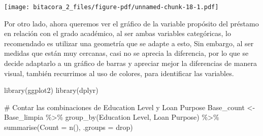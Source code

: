 \documentclass[
  letterpaper,
  DIV=11,
  numbers=noendperiod]{scrreprt}
\newenvironment{Shaded}{\begin{snugshade}}{\end{snugshade}}
\newcommand{\AttributeTok}[1]{\textcolor[rgb]{0.40,0.45,0.13}{#1}}
\newcommand{\CommentTok}[1]{\textcolor[rgb]{0.37,0.37,0.37}{#1}}
\newcommand{\FunctionTok}[1]{\textcolor[rgb]{0.28,0.35,0.67}{#1}}
\newcommand{\NormalTok}[1]{\textcolor[rgb]{0.00,0.23,0.31}{#1}}
\newcommand{\OtherTok}[1]{\textcolor[rgb]{0.00,0.23,0.31}{#1}}
\newcommand{\SpecialCharTok}[1]{\textcolor[rgb]{0.37,0.37,0.37}{#1}}
\newcommand{\StringTok}[1]{\textcolor[rgb]{0.13,0.47,0.30}{#1}}
\begin{document}
\texttt{[image: bitacora\_2\_files/figure-pdf/unnamed-chunk-18-1.pdf]}

Por otro lado, ahora queremos ver el gráfico de la variable propósito
del préstamo en relación con el grado académico, al ser ambas variables
categóricas, lo recomendado es utilizar una geometría que se adapte a
esto, Sin embargo, al ser medidas que están muy cercanas, casi no se
aprecia la diferencia, por lo que se decide adaptarlo a un gráfico de
barras y apreciar mejor la diferencias de manera visual, también
recurrimos al uso de colores, para identificar las variables.

\begin{Shaded}
\begin{Highlighting}[]
\FunctionTok{library}\NormalTok{(ggplot2)}
\FunctionTok{library}\NormalTok{(dplyr)}

\CommentTok{\# Contar las combinaciones de Education Level y Loan Purpose}
\NormalTok{Base\_count }\OtherTok{\textless{}{-}}\NormalTok{ Base\_limpia }\SpecialCharTok{\%\textgreater{}\%}
  \FunctionTok{group\_by}\NormalTok{(}\StringTok{\textasciigrave{}}\AttributeTok{Education Level}\StringTok{\textasciigrave{}}\NormalTok{, }\StringTok{\textasciigrave{}}\AttributeTok{Loan Purpose}\StringTok{\textasciigrave{}}\NormalTok{) }\SpecialCharTok{\%\textgreater{}\%}
  \FunctionTok{summarise}\NormalTok{(}\AttributeTok{Count =} \FunctionTok{n}\NormalTok{(), }\AttributeTok{.groups =} \StringTok{\textquotesingle{}drop\textquotesingle{}}\NormalTok{)}


\end{Highlighting}
\end{Shaded}
\end{document}
